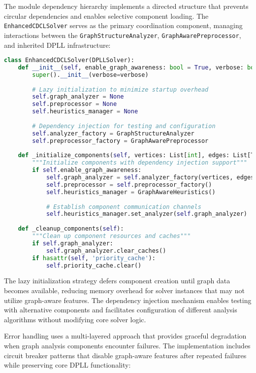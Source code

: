 The module dependency hierarchy implements a directed structure that prevents circular dependencies and enables selective component loading. The \texttt{EnhancedCDCLSolver} serves as the primary coordination component, managing interactions between the \texttt{Graph\-Structure\-Analyzer}, \texttt{GraphAwarePreprocessor}, and inherited DPLL infrastructure:

\begin{lstlisting}[language=Python, caption=Module Dependency Management]
class EnhancedCDCLSolver(DPLLSolver):
    def __init__(self, enable_graph_awareness: bool = True, verbose: bool = False):
        super().__init__(verbose=verbose)
        
        # Lazy initialization to minimize startup overhead
        self.graph_analyzer = None
        self.preprocessor = None
        self.heuristics_manager = None
        
        # Dependency injection for testing and configuration
        self.analyzer_factory = GraphStructureAnalyzer
        self.preprocessor_factory = GraphAwarePreprocessor
        
    def _initialize_components(self, vertices: List[int], edges: List[Tuple[int, int]]):
        """Initialize components with dependency injection support"""
        if self.enable_graph_awareness:
            self.graph_analyzer = self.analyzer_factory(vertices, edges)
            self.preprocessor = self.preprocessor_factory()
            self.heuristics_manager = GraphAwareHeuristics()
            
            # Establish component communication channels
            self.heuristics_manager.set_analyzer(self.graph_analyzer)
        
    def _cleanup_components(self):
        """Clean up component resources and caches"""
        if self.graph_analyzer:
            self.graph_analyzer.clear_caches()
        if hasattr(self, 'priority_cache'):
            self.priority_cache.clear()
\end{lstlisting}

The lazy initialization strategy defers component creation until graph data becomes available, reducing memory overhead for solver instances that may not utilize graph-aware features. The dependency injection mechanism enables testing with alternative components and facilitates configuration of different analysis algorithms without modifying core solver logic.

Error handling uses a multi-layered approach that provides graceful degradation when graph analysis components encounter failures. The implementation includes circuit breaker patterns that disable graph-aware features after repeated failures while preserving core DPLL functionality:

